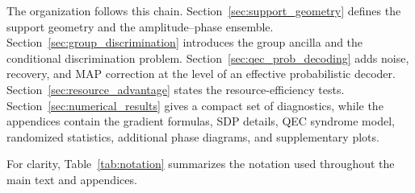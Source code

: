 \documentclass[
 reprint,
 amsmath,amssymb,
 aps,
 pra,
 floatfix,
]{revtex4-2}
\begin{document}
The organization follows this chain. Section~\ref{sec:support_geometry} defines the support geometry and the amplitude--phase ensemble. Section~\ref{sec:group_discrimination} introduces the group ancilla and the conditional discrimination problem. Section~\ref{sec:qec_prob_decoding} adds noise, recovery, and MAP correction at the level of an effective probabilistic decoder. Section~\ref{sec:resource_advantage} states the resource-efficiency tests. Section~\ref{sec:numerical_results} gives a compact set of diagnostics, while the appendices contain the gradient formulas, SDP details, QEC syndrome model, randomized statistics, additional phase diagrams, and supplementary plots.

For clarity, Table~\ref{tab:notation} summarizes the notation used throughout the main text and appendices.
\end{document}
